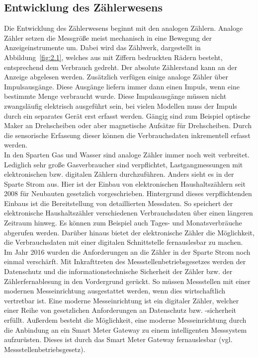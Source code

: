 \subsection{Entwicklung des Zählerwesens}\label{subsec:Entwicklung}
    Die Entwicklung des Zählerwesens beginnt mit den analogen Zählern. Analoge Zähler setzen die Messgröße meist mechanisch in eine Bewegung der Anzeigeinstrumente um. Dabei wird das Zählwerk, dargestellt in Abbildung~\ref{fig:2.1}, welches aus mit Ziffern bedruckten Rädern besteht, entsprechend dem Verbrauch gedreht. Der absolute Zählerstand kann an der Anzeige abgelesen werden. Zusätzlich verfügen einige analoge Zähler über Impulsausgänge. Diese Ausgänge liefern immer dann einen Impuls, wenn eine bestimmte Menge verbraucht wurde. Diese Impulsausgänge müssen nicht zwangsläufig elektrisch ausgeführt sein, bei vielen Modellen muss der Impuls durch ein separates Gerät erst erfasst werden. Gängig sind zum Beispiel optische Maker an Drehscheiben oder aber magnetische Aufsätze für Drehscheiben. Durch die sensorische Erfassung dieser können die Verbrauchsdaten inkrementell erfasst werden\cite{Fach2018}.\\ In den Sparten Gas und Wasser sind analoge Zähler immer noch weit verbreitet. Lediglich sehr große Gasverbraucher sind verpflichtet, Lastgangmessungen mit elektronischen bzw. digitalen Zählern durchzuführen. Anders sieht es in der Sparte Strom aus. Hier ist der Einbau von elektronischen Haushaltszählern seit 2008 für Neubauten gesetzlich vorgeschrieben. Hintergrund dieses verpflichtenden Einbaus ist die Bereitstellung von detaillierten Messdaten. So speichert der elektronische Haushaltszähler verschiedenen Verbrauchsdaten über einen längeren Zeitraum hinweg. Es können zum Beispiel auch Tages- und Monatsverbräuche abgerufen werden. Darüber hinaus bietet der elektronische Zähler die Möglichkeit, die Verbrauchsdaten mit einer digitalen Schnittstelle fernauslesbar zu machen\cite{Meinecke2017}.\\ Im Jahr 2016 wurden die Anforderungen an die Zähler in der Sparte Strom noch einmal verschärft. Mit Inkrafttreten des Messstellenbetriebsgesetzes werden der Datenschutz und die informationstechnische Sicherheit der Zähler bzw. der Zählerfernablesung in den Vordergrund gerückt. So müssen Messstellen mit einer modernen Messeinrichtung ausgestattet werden, wenn dies wirtschaftlich vertretbar ist. Eine moderne Messeinrichtung ist ein digitaler Zähler, welcher einer Reihe von gesetzlichen Anforderungen an Datenschutz bzw. -sicherheit erfüllt. Außerdem besteht die Möglichkeit, eine moderne Messeinrichtung durch die Anbindung an ein Smart Meter Gateway zu einem intelligenten Messsystem aufzurüsten. Dieses ist durch das Smart Meter Gateway fernauslesbar (vgl. Messstellenbetriebsgesetz).


